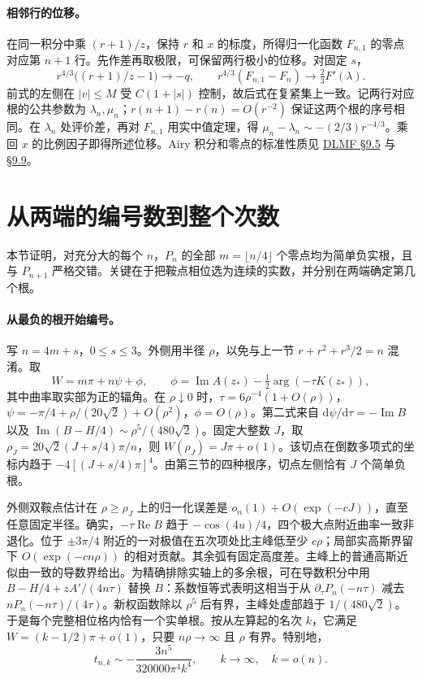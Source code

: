 \documentclass[UTF8,fontset=fandol,11pt,a4paper]{ctexart}
\newcommand{\Rea}{\operatorname{Re}}
\newcommand{\Ima}{\operatorname{Im}}
\newcommand{\dd}{\mathrm d}
\begin{document}
\paragraph{相邻行的位移。}
在同一积分中乘 $(r+1)/z$，保持 $r$ 和 $x$ 的标度，所得归一化函数 $F_{n,1}$ 的零点对应第 $n+1$ 行。先作差再取极限，可保留两行极小的位移。对固定 $s$，
\[
 r^{4/3}\big((r+1)/z-1\big)\to-q,\qquad
 r^{4/3}(F_{n,1}-F_n)\to\tfrac23 F'(\lambda).
\]
前式的左侧在 $|v|\le M$ 受 $C(1+|s|)$ 控制，故后式在复紧集上一致。记两行对应根的公共参数为 $\lambda_n,\mu_n$；$r(n+1)-r(n)=O(r^{-2})$ 保证这两个根的序号相同。在 $\lambda_n$ 处评价差，再对 $F_{n,1}$ 用实中值定理，得 $\mu_n-\lambda_n\sim-(2/3)r^{-4/3}$。乘回 $x$ 的比例因子即得所述位移。Airy 积分和零点的标准性质见 \href{https://dlmf.nist.gov/9.5}{DLMF §9.5} 与 \href{https://dlmf.nist.gov/9.9}{§9.9}。

\section{从两端的编号数到整个次数}
本节证明，对充分大的每个 $n$，$P_n$ 的全部 $m=\lfloor n/4\rfloor$ 个零点均为简单负实根，且与 $P_{n+1}$ 严格交错。关键在于把鞍点相位选为连续的实数，并分别在两端确定第几个根。

\paragraph{从最负的根开始编号。}
写 $n=4m+s$，$0\le s\le3$。外侧用半径 $\rho$，以免与上一节 $r+r^2+r^3/2=n$ 混淆。取
\[
 W=m\pi+n\psi+\phi,\qquad
 \phi=\Ima A(z_*)-\tfrac12\arg(-\tau K(z_*)),
\]
其中曲率取实部为正的辐角。在 $\rho\downarrow0$ 时，$\tau=6\rho^{-4}(1+O(\rho))$，$\psi=-\pi/4+\rho/(20\sqrt2)+O(\rho^2)$，$\phi=O(\rho)$。第二式来自 $\dd\psi/\dd\tau=-\Ima B$ 以及 $\Ima(B-H/4)\sim\rho^5/(480\sqrt2)$。固定大整数 $J$，取 $\rho_J=20\sqrt2(J+s/4)\pi/n$，则 $W(\rho_J)=J\pi+o(1)$。该切点在倒数多项式的坐标内趋于 $-4[(J+s/4)\pi]^4$。由第三节的四种根序，切点左侧恰有 $J$ 个简单负根。

外侧双鞍点估计在 $\rho\ge\rho_J$ 上的归一化误差是 $o_n(1)+O(\exp(-cJ))$，直至任意固定半径。确实，$-\tau\Rea B$ 趋于 $-\cos(4u)/4$，四个极大点附近曲率一致非退化。位于 $\pm3\pi/4$ 附近的一对极值在五次项处比主峰低至少 $c\rho$；局部实高斯界留下 $O(\exp(-cn\rho))$ 的相对贡献。其余弧有固定高度差。主峰上的普通高斯近似由一致的导数界给出。为精确排除实轴上的多余根，可在导数积分中用 $B-H/4+zA'/(4n\tau)$ 替换 $B$：系数恒等式表明这相当于从 $\partial_\tau P_n(-n\tau)$ 减去 $nP_n(-n\tau)/(4\tau)$。新权函数除以 $\rho^5$ 后有界，主峰处虚部趋于 $1/(480\sqrt2)$。于是每个完整相位格内恰有一个实单根。按从左算起的名次 $k$，它满足 $W=(k-1/2)\pi+o(1)$，只要 $n\rho\to\infty$ 且 $\rho$ 有界。特别地，
\[
 t_{n,k}\sim-\frac{3n^5}{320000\pi^4 k^4},\qquad k\to\infty,\quad k=o(n).
\]
\end{document}
